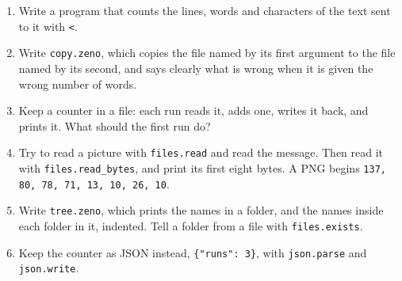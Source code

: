 \begin{tryit}
\begin{enumerate}
\item Write a program that counts the lines, words and characters of
  the text sent to it with \verb|<|.
\item Write \verb|copy.zeno|, which copies the file named by its first
  argument to the file named by its second, and says clearly what is
  wrong when it is given the wrong number of words.
\item Keep a counter in a file: each run reads it, adds one, writes it
  back, and prints it. What should the first run do?
\item Try to read a picture with \verb|files.read| and read the
  message. Then read it with \verb|files.read_bytes|, and print its
  first eight bytes. A PNG begins \verb|137, 80, 78, 71, 13, 10, 26, 10|.
\item Write \verb|tree.zeno|, which prints the names in a folder,
  and the names inside each folder in it, indented. Tell a folder
  from a file with \verb|files.exists|.
\item Keep the counter as JSON instead, \verb|{"runs": 3}|, with
  \verb|json.parse| and \verb|json.write|.
\end{enumerate}
\end{tryit}
